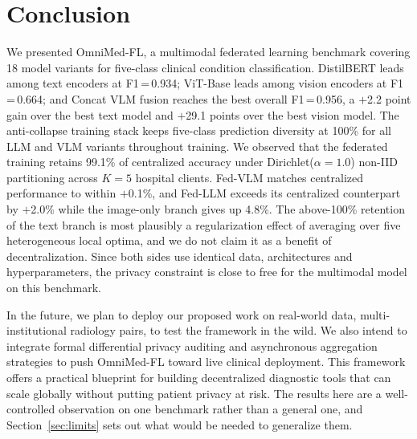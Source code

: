 \documentclass[letterpaper, conference]{IEEEtran}
\begin{document}
\section{Conclusion}
We presented OmniMed-FL, a multimodal federated learning benchmark covering 18 model variants for five-class clinical condition classification. DistilBERT leads among text encoders at F1\,=\,0.934; ViT-Base leads among vision encoders at F1\,=\,0.664; and Concat VLM fusion reaches the best overall F1\,=\,0.956, a $+$2.2 point gain over
the best text model and $+$29.1 points over the best vision model. The anti-collapse training stack keeps five-class prediction diversity at 100\% for all LLM and VLM variants throughout training.  We observed that the federated training retains 99.1\% of centralized accuracy under Dirichlet($\alpha{=}1.0$) non-IID partitioning across $K{=}5$ hospital clients. Fed-VLM matches centralized performance to within $+$0.1\%, and Fed-LLM exceeds its centralized counterpart by $+$2.0\% while the image-only branch gives up 4.8\%. The above-100\% retention of the text branch is most plausibly a regularization effect of averaging over five heterogeneous local optima, and we do not claim it as a benefit of decentralization. Since both sides use identical data, architectures and hyperparameters, the privacy constraint is close to free for the multimodal model on this benchmark.

In the future, we plan to deploy our proposed work on real-world data, multi-institutional radiology pairs, to test the framework in the wild. We also intend to integrate formal differential privacy auditing and asynchronous aggregation strategies to push OmniMed-FL toward live clinical deployment. This framework offers a practical blueprint for building decentralized diagnostic tools that can scale globally without putting patient privacy at risk.
The results here are a well-controlled observation on one benchmark rather than a general one, and Section~\ref{sec:limits} sets out what would be needed to generalize them. %

\FloatBarrier

\let\oldbibliography\thebibliography
\renewcommand{\thebibliography}[1]{%
  \oldbibliography{#1}%
  \scriptsize
  \setlength{\itemsep}{0pt}%
  \setlength{\parskip}{0pt}%
  \setlength{\topsep}{0pt}%
}
\end{document}

